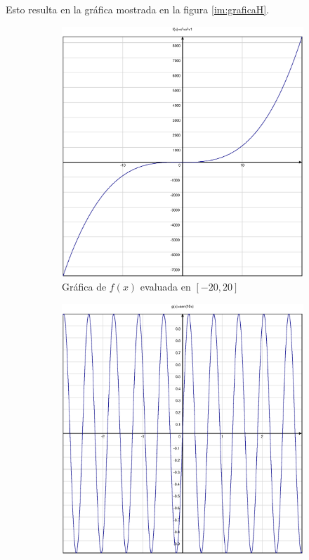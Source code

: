 \documentclass[10pt]{article}
\begin{document}
\noindent Esto resulta en la gráfica mostrada en la figura \ref{im:graficaH}.
\begin{figure}[H]
    \begin{subfigure}[b]{0.3\textwidth}
        \includegraphics[width=\textwidth]{figures/graficaF.eps}
        \centering
        \caption{Gráfica de $f(x)$ evaluada en $[-20,20]$}
        \label{im:graficaF}
    \end{subfigure}
    \hfill
    \begin{subfigure}[b]{0.3\textwidth}
        \includegraphics[width=\textwidth]{figures/graficaG.eps}

\end{subfigure}
\end{figure}
\end{document}
